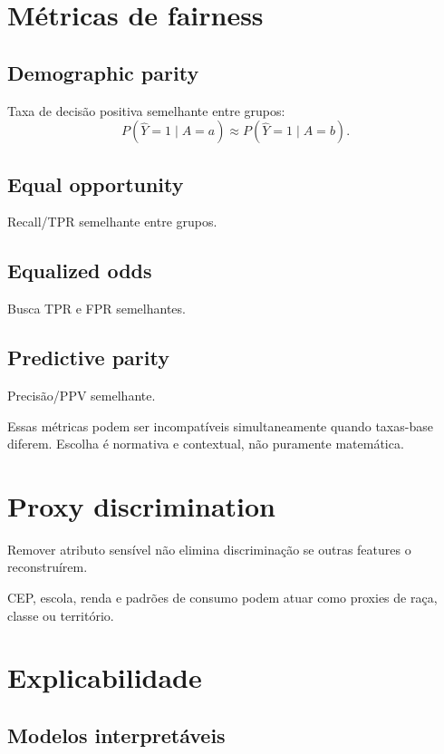 \section{Métricas de fairness}

\subsection{Demographic parity}

Taxa de decisão positiva semelhante entre grupos:
\[
P(\hat Y=1\mid A=a)\approx P(\hat Y=1\mid A=b).
\]

\subsection{Equal opportunity}

Recall/TPR semelhante entre grupos.

\subsection{Equalized odds}

Busca TPR e FPR semelhantes.

\subsection{Predictive parity}

Precisão/PPV semelhante.

Essas métricas podem ser incompatíveis simultaneamente quando taxas-base diferem. Escolha é normativa e contextual, não puramente matemática.

\section{Proxy discrimination}

Remover atributo sensível não elimina discriminação se outras features o reconstruírem.

CEP, escola, renda e padrões de consumo podem atuar como proxies de raça, classe ou território.

\section{Explicabilidade}

\subsection{Modelos interpretáveis}

